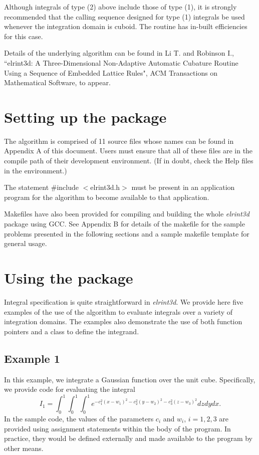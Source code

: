 \documentclass[10pt]{article}
\def \algorithm {\textit{elrint3d} }
\def \algorithmNoSpace {\textit{elrint3d}}
\begin{document}
Although integrals of type (2) above include those of type (1), it
is strongly recommended that the calling sequence designed for
type (1) integrals be used whenever the integration domain is
cuboid.  The routine has in-built efficiencies for this case.

Details of the underlying algorithm can be found in Li T. and
Robinson I., ``elrint3d: A Three-Dimensional Non-Adaptive Automatic
Cubature Routine Using a Sequence of Embedded Lattice Rules", ACM
Transactions on Mathematical Software, to appear.

\section{Setting up the package}

The algorithm is comprised of 11 source files whose names can be
found in Appendix A of this document.  Users must ensure that all
of these files are in the compile path of their development
environment.  (If in doubt, check the Help files in the
environment.)

The statement \#include  $<$elrint3d.h$>$ must be present in an
application program for the algorithm to become available to that
application.

Makefiles have also been provided for compiling and building the
whole \algorithm package using GCC.  See Appendix B for details
of the makefile for the sample problems presented in the following
sections and a sample makefile template for general usage.

\section{Using the package}

Integral specification is quite straightforward in
\algorithmNoSpace. We provide here five examples of the use of the
algorithm to evaluate integrals over a variety of integration
domains.  The examples also demonstrate the use of both function
pointers and a class to define the integrand.

\subsection{Example 1}

In this example, we integrate a Gaussian function over the unit
cube.  Specifically, we provide code for evaluating the integral
$$
I_1=\int_0^1\int_0^1\int_0^1e^{-c_1^2(x-w_1)^2-c_2^2(y-w_2)^2-c_3^2(z-w_3)^2}dzdydx.
$$
In the sample code, the values of the parameters $c_i$ and $w_i$,
$i=1,2,3$ are provided using assignment statements within the body
of the program. In practice, they would be defined externally and
made available to the program by other means.
\end{document}
